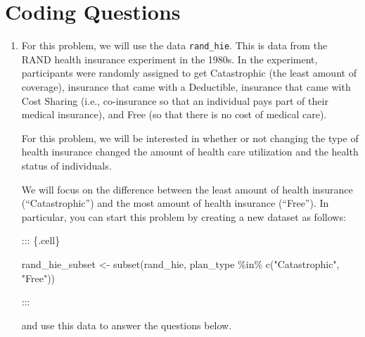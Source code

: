 \documentclass[
  letterpaper,
  DIV=11,
  numbers=noendperiod]{scrreprt}
\newenvironment{Shaded}{\begin{snugshade}}{\end{snugshade}}
\newcommand{\FunctionTok}[1]{\textcolor[rgb]{0.28,0.35,0.67}{#1}}
\newcommand{\NormalTok}[1]{\textcolor[rgb]{0.00,0.23,0.31}{#1}}
\newcommand{\OtherTok}[1]{\textcolor[rgb]{0.00,0.23,0.31}{#1}}
\newcommand{\SpecialCharTok}[1]{\textcolor[rgb]{0.37,0.37,0.37}{#1}}
\newcommand{\StringTok}[1]{\textcolor[rgb]{0.13,0.47,0.30}{#1}}
\begin{document}
\section{Coding Questions}\label{coding-questions-4}

\begin{enumerate}
\def\labelenumi{\arabic{enumi}.}
\item
  For this problem, we will use the data \texttt{rand\_hie}. This is
  data from the RAND health insurance experiment in the 1980s. In the
  experiment, participants were randomly assigned to get Catastrophic
  (the least amount of coverage), insurance that came with a Deductible,
  insurance that came with Cost Sharing (i.e., co-insurance so that an
  individual pays part of their medical insurance), and Free (so that
  there is no cost of medical care).

  For this problem, we will be interested in whether or not changing the
  type of health insurance changed the amount of health care utilization
  and the health status of individuals.

  We will focus on the difference between the least amount of health
  insurance (``Catastrophic'') and the most amount of health insurance
  (``Free''). In particular, you can start this problem by creating a
  new dataset as follows:

  ::: \{.cell\}

\begin{Shaded}
\begin{Highlighting}[]
\NormalTok{    rand\_hie\_subset }\OtherTok{\textless{}{-}} \FunctionTok{subset}\NormalTok{(rand\_hie, plan\_type }\SpecialCharTok{\%in\%} \FunctionTok{c}\NormalTok{(}\StringTok{"Catastrophic"}\NormalTok{, }\StringTok{"Free"}\NormalTok{))}
\end{Highlighting}
\end{Shaded}

  :::

  and use this data to answer the questions below.


\end{enumerate}
\end{document}
